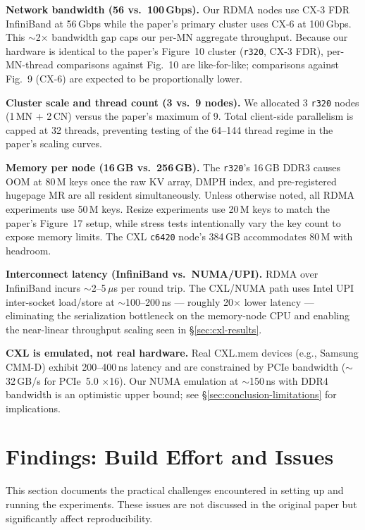 \documentclass[conference]{IEEEtran}
\begin{document}
\textbf{Network bandwidth (56 vs.\ 100\,Gbps).} Our RDMA nodes use CX-3 FDR InfiniBand at 56\,Gbps while the paper's primary cluster uses CX-6 at 100\,Gbps. This $\sim$2$\times$ bandwidth gap caps our per-MN aggregate throughput. Because our hardware is identical to the paper's Figure~10 cluster (\texttt{r320}, CX-3 FDR), per-MN-thread comparisons against Fig.~10 are like-for-like; comparisons against Fig.~9 (CX-6) are expected to be proportionally lower.

\textbf{Cluster scale and thread count (3 vs.\ 9 nodes).} We allocated 3 \texttt{r320} nodes (1\,MN + 2\,CN) versus the paper's maximum of 9. Total client-side parallelism is capped at 32 threads, preventing testing of the 64--144 thread regime in the paper's scaling curves.

\textbf{Memory per node (16\,GB vs.\ 256\,GB).} The \texttt{r320}'s 16\,GB DDR3 causes OOM at 80\,M keys once the raw KV array, DMPH index, and pre-registered hugepage MR are all resident simultaneously. Unless otherwise noted, all RDMA experiments use 50\,M keys. Resize experiments use 20\,M keys to match the paper's Figure~17 setup, while stress tests intentionally vary the key count to expose memory limits. The CXL \texttt{c6420} node's 384\,GB accommodates 80\,M with headroom.

\textbf{Interconnect latency (InfiniBand vs.\ NUMA/UPI).} RDMA over InfiniBand incurs $\sim$2--5\,$\mu$s per round trip. The CXL/NUMA path uses Intel UPI inter-socket load/store at $\sim$100--200\,ns --- roughly 20$\times$ lower latency --- eliminating the serialization bottleneck on the memory-node CPU and enabling the near-linear throughput scaling seen in \S\ref{sec:cxl-results}.

\textbf{CXL is emulated, not real hardware.} Real CXL.mem devices (e.g., Samsung CMM-D) exhibit 200--400\,ns latency and are constrained by PCIe bandwidth ($\sim$32\,GB/s for PCIe~5.0 $\times$16). Our NUMA emulation at $\sim$150\,ns with DDR4 bandwidth is an optimistic upper bound; see \S\ref{sec:conclusion-limitations} for implications.

\section{Findings: Build Effort and Issues}

This section documents the practical challenges encountered in setting up and running the experiments. These issues are not discussed in the original paper but significantly affect reproducibility.
\end{document}
